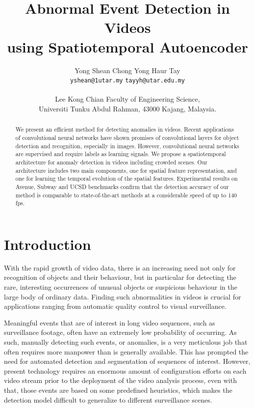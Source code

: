 \documentclass[a4paper]{article}
\def\email#1{\texttt{#1}}
\def\institute#1{#1}
\begin{document}
\title{Abnormal Event Detection in Videos\\ using Spatiotemporal Autoencoder}


\author{Yong Shean Chong \qquad Yong Haur Tay \\ \email{yshean@1utar.my} \qquad \email{tayyh@utar.edu.my} \\\\
\institute{Lee Kong Chian Faculty of Engineering Science,\\
	Universiti Tunku Abdul Rahman, 43000 Kajang, Malaysia.}
}


\maketitle


\begin{abstract}
We present an efficient method for detecting anomalies in videos. Recent applications of convolutional neural networks have shown promises of convolutional layers for object detection and recognition, especially in images. However, convolutional neural networks are supervised and require labels as learning signals. We propose a spatiotemporal architecture for anomaly detection in videos including crowded scenes. Our architecture includes two main components, one for spatial feature representation, and one for learning the temporal evolution of the spatial features. Experimental results on Avenue, Subway and UCSD benchmarks confirm that the detection  accuracy of our method is comparable to state-of-the-art methods at a considerable speed of up to 140 fps.
\end{abstract}


\section{Introduction}

With the rapid growth of video data, there is an increasing need not only for recognition of objects and their behaviour, but in particular for detecting the rare, interesting occurrences of unusual objects or suspicious behaviour in the large body of ordinary data. Finding such abnormalities in videos is crucial for applications ranging from automatic quality control to visual surveillance.

Meaningful events that are of interest in long video sequences, such as surveillance footage, often have an extremely low probability of occurring. As such, manually detecting such events, or anomalies, is a very meticulous job that often requires more manpower than is generally available. This has prompted the need for automated detection and segmentation of sequences of interest. However, present technology requires an enormous amount of configuration efforts on each video stream prior to the deployment of the video analysis process, even with that, those events are based on some predefined heuristics, which makes the detection model difficult to generalize to different surveillance scenes. 
\end{document}
